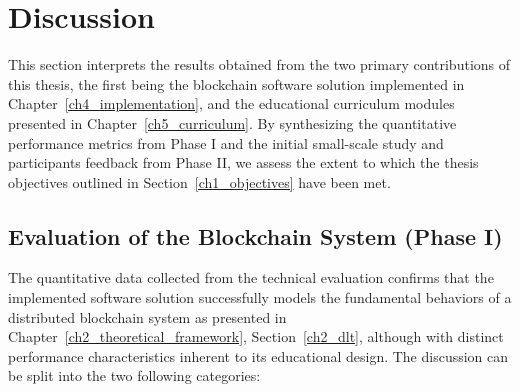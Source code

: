 \section{Discussion} \label{sec:discussion}
This section interprets the results obtained from the two primary contributions of this thesis, the first being the blockchain software solution implemented in Chapter~\ref{ch4_implementation}, and the educational curriculum modules presented in Chapter~\ref{ch5_curriculum}. By synthesizing the quantitative performance metrics from Phase I and the initial small-scale study and participants feedback from Phase II, we assess the extent to which the thesis objectives outlined in Section~\ref{ch1_objectives} have been met.

\subsection{Evaluation of the Blockchain System (Phase I)}
The quantitative data collected from the technical evaluation confirms that the implemented software solution successfully models the fundamental behaviors of a distributed blockchain system as presented in Chapter~\ref{ch2_theoretical_framework}, Section~\ref{ch2_dlt}, although with distinct performance characteristics inherent to its educational design. The discussion can be split into the two following categories:

